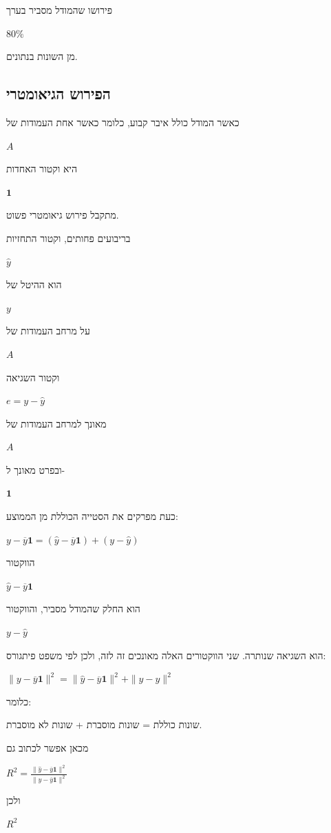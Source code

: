 \documentclass[12pt]{report}
\theoremstyle{plain}
\theoremstyle{definition}
\newcommand{\0}{\mathbf{0}}
\begin{document}
פירושו שהמודל מסביר בערך

$
80\%
$

מן השונות בנתונים.

\subsection*{הפירוש הגיאומטרי}

כאשר המודל כולל איבר קבוע, כלומר כאשר אחת העמודות של

$
A
$

היא וקטור האחדות

$
\mathbf{1}
$

מתקבל פירוש גיאומטרי פשוט.

בריבועים פחותים, וקטור התחזיות

$
\hat{y}
$

הוא ההיטל של

$
y
$

על מרחב העמודות של

$
A
$

וקטור השגיאה

$
e=y-\hat{y}
$

מאונך למרחב העמודות של

$
A
$

ובפרט מאונך ל-

$
\mathbf{1}
$

כעת מפרקים את הסטייה הכוללת מן הממוצע:

$
y-\overline{y}\mathbf{1}
=
(\hat{y}-\overline{y}\mathbf{1})
+
(y-\hat{y})
$

הווקטור

$
\hat{y}-\overline{y}\mathbf{1}
$

הוא החלק שהמודל מסביר, והווקטור

$
y-\hat{y}
$

הוא השגיאה שנותרה.
שני הווקטורים האלה מאונכים זה לזה, ולכן לפי משפט פיתגורס:

$
\|y-\overline{y}\mathbf{1}\|^2
=
\|\hat{y}-\overline{y}\mathbf{1}\|^2
+
\|y-\hat{y}\|^2
$

כלומר:

\begin{center}
שונות כוללת = שונות מוסברת + שונות לא מוסברת.
\end{center}

מכאן אפשר לכתוב גם

$
R^2
=
\frac{\|\hat{y}-\overline{y}\mathbf{1}\|^2}
{\|y-\overline{y}\mathbf{1}\|^2}
$

ולכן

$
R^2
$
\end{document}
